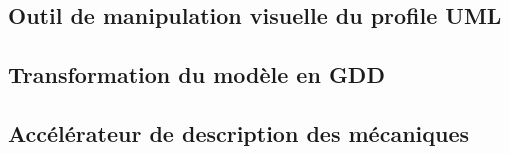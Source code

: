 \subsection{Outil de manipulation visuelle du profile UML}
\subsection{Transformation du modèle en GDD}
\subsection{Accélérateur de description des mécaniques}







